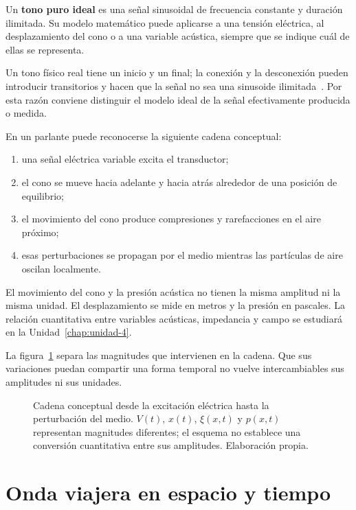 Un \textbf{tono puro ideal} es una señal sinusoidal de frecuencia constante y
duración ilimitada. Su modelo matemático puede aplicarse a una tensión
eléctrica, al desplazamiento del cono o a una variable acústica, siempre que
se indique cuál de ellas se representa.

Un tono físico real tiene un inicio y un final; la conexión y la
desconexión pueden introducir transitorios y hacen que la señal no sea una
sinusoide ilimitada~\cite{xiangBlauert2021}. Por esta razón conviene distinguir el modelo ideal de la
señal efectivamente producida o medida.

En un parlante puede reconocerse la siguiente cadena conceptual:

\begin{enumerate}
    \item una señal eléctrica variable excita el transductor;
    \item el cono se mueve hacia adelante y hacia atrás alrededor de una
    posición de equilibrio;
    \item el movimiento del cono produce compresiones y rarefacciones en el
    aire próximo;
    \item esas perturbaciones se propagan por el medio mientras las partículas
    de aire oscilan localmente.
\end{enumerate}

El movimiento del cono y la presión acústica no tienen la misma amplitud ni la
misma unidad. El desplazamiento se mide en metros y la presión en pascales. La
relación cuantitativa entre variables acústicas, impedancia y campo se
estudiará en la Unidad~\ref{chap:unidad-4}.

La figura~\ref{fig:u3-parlante-medio} separa las magnitudes que intervienen en
la cadena. Que sus variaciones puedan compartir una forma temporal no vuelve
intercambiables sus amplitudes ni sus unidades.

\begin{figure}[htbp]
    \centering
    
    \caption{Cadena conceptual desde la excitación eléctrica hasta la
    perturbación del medio. \(V(t)\), \(x(t)\), \(\xi(x,t)\) y \(p(x,t)\)
    representan magnitudes diferentes; el esquema no establece una conversión
    cuantitativa entre sus amplitudes. Elaboración propia.}
    \label{fig:u3-parlante-medio}
\end{figure}

\section{Onda viajera en espacio y tiempo}
\label{sec:u3-onda-viajera}

